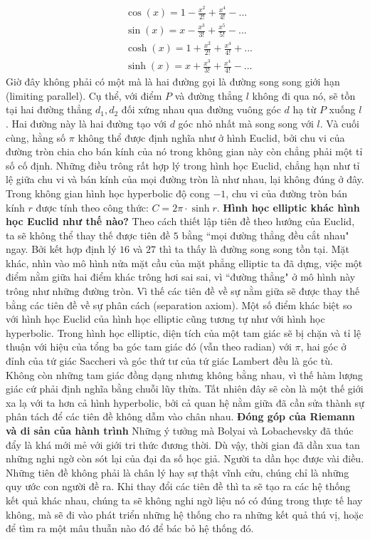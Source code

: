 \begin{multicols}{2}
\begin{align*}
		&\cos(x) =  1 - \frac{x^2}{2!} + \frac{x^4}{4!} - ... \\
		&\sin(x) =  x - \frac{x^3}{3!} + \frac{x^5}{5!} - ... \\
		&\cosh(x) =  1 + \frac{x^2}{2!} + \frac{x^4}{4!} + ... \\
		&\sinh(x) =  x + \frac{x^3}{3!} + \frac{x^4}{4!} - ... 
	\end{align*}
	Giờ đây không phải có một mà là hai đường gọi là đường song song giới hạn (limiting parallel). Cụ thể, với điểm $P$ và đường thẳng $l$ không đi qua nó, sẽ tồn tại hai đường thẳng $d_1, d_2$ đối xứng nhau qua đường vuông góc $d$ hạ từ $P$ xuống $l$. Hai đường này là hai đường tạo với $d$ góc nhỏ nhất mà song song với $l$. 
	\vskip 0.1cm
	Và cuối cùng, hằng số $\pi$  không thể được định nghĩa như ở hình Euclid, bởi chu vi của đường tròn chia cho bán kính của nó trong không gian này còn chẳng phải một tỉ số cố định. Những điều trông rất hợp lý trong hình học Euclid, chẳng hạn như tỉ lệ giữa chu vi và bán kính của mọi đường tròn là như nhau, lại không đúng ở đây. Trong không gian hình học hyperbolic độ cong $-1$, chu vi của đường tròn bán kính $r$ được tính theo công thức: $C = 2\pi\cdot\sinh r$. 
	\vskip 0.1cm
	\textbf{\color{lichsutoanhoc}Hình học elliptic khác hình học Euclid như thế nào?}
	\vskip 0.1cm
	Theo cách thiết lập tiên đề theo hướng của Euclid, ta sẽ không thể thay thế được tiên đề $5$ bằng ``mọi đường thẳng đều cắt nhau" ngay. Bởi kết hợp định lý $16$ và $27$ thì ta thấy là đường song song tồn tại. Mặt khác, nhìn vào mô hình nửa mặt cầu của mặt phẳng elliptic ta đã dựng, việc một điểm nằm giữa hai điểm khác trông hơi sai sai, vì ``đường thẳng" ở mô hình này trông như những đường tròn. Vì thế các tiên đề về sự nằm giữa sẽ được thay thế bằng các tiên đề về sự phân cách (separation axiom). Một số điểm khác biệt so với hình học Euclid của hình học elliptic cũng tương tự như với hình học hyperbolic. Trong hình học elliptic, diện tích của một tam giác sẽ bị chặn và tỉ lệ thuận với hiệu của tổng ba góc tam giác đó (vẫn theo radian) với $\pi$, hai góc ở đỉnh của tứ giác Saccheri và góc thứ tư của tứ giác Lambert đều là góc tù. Không còn những tam giác đồng dạng nhưng không bằng nhau, vì thế hàm lượng giác cứ phải định nghĩa bằng chuỗi lũy thừa. Tất nhiên đây sẽ còn là một thế giới xa lạ với ta hơn cả hình hyperbolic, bởi cả quan hệ nằm giữa đã cần sửa thành sự phân tách để các tiên đề không dẫm vào chân nhau.
	\vskip 0.1cm
	\textbf{\color{lichsutoanhoc}Đóng góp của Riemann và di sản của hành trình}
	\vskip 0.1cm
	Những ý tưởng mà Bolyai và Lobachevsky đã thúc đẩy là khá mới mẻ với giới tri thức đương thời. Dù vậy, thời gian đã dần xua tan những nghi ngờ còn sót lại của đại đa số học giả. Người ta dần học được vài điều. Những tiên đề không phải là chân lý hay sự thật vĩnh cửu, chúng chỉ là những quy ước con người đề ra. Khi thay đổi các tiên đề thì ta sẽ tạo ra các hệ thống kết quả khác nhau, chúng ta sẽ không nghi ngờ liệu nó có đúng trong thực tế hay không, mà sẽ đi vào phát triển những hệ thống cho ra những kết quả thú vị, hoặc để tìm ra một mâu thuẫn nào đó để bác bỏ hệ thống đó.

\end{multicols}
